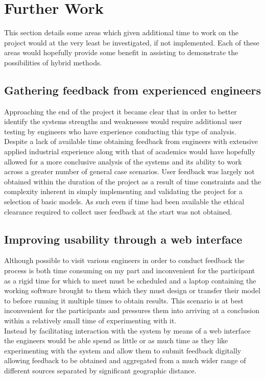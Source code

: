 
\section{Further Work}
This section details some areas which given additional time to work on the project would at the very least be investigated, if not implemented. Each of these areas would hopefully provide some benefit in assisting to demonstrate the possibilities of hybrid methods.

\subsection{Gathering feedback from experienced engineers}
Approaching the end of the project it became clear that in order to better identify the systems strengths and weaknesses would require additional user testing by engineers who have experience conducting this type of analysis. Despite a lack of available time obtaining feedback from engineers with extensive applied industrial experience along with that of academics would have hopefully allowed for a more conclusive analysis of the systems and its ability to work across a greater number of general case scenarios. 
User feedback was largely not obtained within the duration of the project as a result of time constraints and the complexity inherent in simply implementing and validating the project for a selection of basic models. As such even if time had been available the ethical clearance required to collect user feedback at the start was not obtained.


\subsection{Improving usability through a web interface}
Although possible to visit various engineers in order to conduct feedback the process is both time consuming on my part and inconvenient for the participant as a rigid time for which to meet must be scheduled and a laptop containing the working software brought to them which they must design or transfer their model to before running it multiple times to obtain results. This scenario is at best inconvenient for the participants and pressures them into arriving at a conclusion within a relatively small time of experimenting with it. \\ 

\noindent
Instead by facilitating interaction with the system by means of a web interface the engineers would be able spend as little or as much time as they like experimenting with the system and allow them to submit feedback digitally allowing feedback to be obtained and aggregated from a much wider range of different sources separated by significant geographic distance. \\\ 

